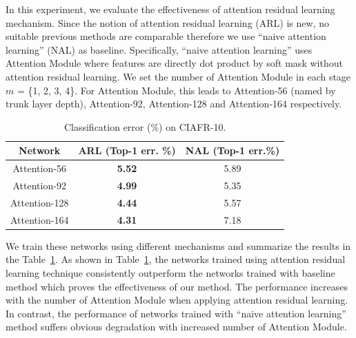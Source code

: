 \documentclass[10pt,twocolumn,letterpaper]{article}
\begin{document}
In this experiment, we evaluate the effectiveness of attention residual learning mechanism.
%
Since the notion of attention residual learning (ARL) is new, no suitable previous methods are comparable therefore we use ``naive attention learning'' (NAL) as baseline.
%
Specifically, ``naive attention learning'' uses Attention Module where features are directly dot product by soft mask without attention residual learning.
%
We set the number of Attention Module in each stage $m$ = \{1, 2, 3, 4\}. For Attention Module, this leads to Attention-56 (named by trunk layer depth), Attention-92, Attention-128 and Attention-164 respectively.
%
\begin{table}\small
\setlength{\abovecaptionskip}{0pt}
\setlength{\belowcaptionskip}{-10pt}
\begin{center}
\begin{tabular}{c|c|c} \hline
 Network & ARL (Top-1 err. \%) & NAL (Top-1 err.\%)\\
\hline
Attention-56 &\textbf{5.52} & 5.89\\
\hline
Attention-92 &\textbf{4.99} & 5.35\\
\hline
Attention-128 &\textbf{4.44} & 5.57\\
\hline
Attention-164 &\textbf{4.31} & 7.18\\
\hline
\end{tabular}
\end{center}
\caption{
Classification error (\%) on CIAFR-10.}
\label{tab:learning}
\end{table}

We train these networks using different mechanisms and summarize the results in the Table~\ref{tab:learning}.
%
As shown in Table~\ref{tab:learning}, the networks trained using attention residual learning technique consistently outperform the networks trained with baseline method which proves the effectiveness of our method. 
%
The performance increases with the number of Attention Module when applying attention residual learning. In contrast, the performance of networks trained with ``naive attention learning'' method suffers obvious degradation with increased number of Attention Module.
\end{document}
